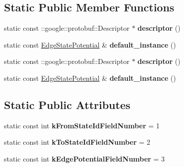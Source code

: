 \subsection*{Static Public Member Functions}
\begin{DoxyCompactItemize}
\item 
\hypertarget{classgraph_1_1EdgeStatePotential_a2256743e6b7a1cb3df066e83d437dd3b}{
static const ::google::protobuf::Descriptor $\ast$ {\bfseries descriptor} ()}
\label{classgraph_1_1EdgeStatePotential_a2256743e6b7a1cb3df066e83d437dd3b}

\item 
\hypertarget{classgraph_1_1EdgeStatePotential_a96e42fc32c65aa17a1482bd1a0d24ed3}{
static const \hyperlink{classgraph_1_1EdgeStatePotential}{EdgeStatePotential} \& {\bfseries default\_\-instance} ()}
\label{classgraph_1_1EdgeStatePotential_a96e42fc32c65aa17a1482bd1a0d24ed3}

\item 
\hypertarget{classgraph_1_1EdgeStatePotential_a2256743e6b7a1cb3df066e83d437dd3b}{
static const ::google::protobuf::Descriptor $\ast$ {\bfseries descriptor} ()}
\label{classgraph_1_1EdgeStatePotential_a2256743e6b7a1cb3df066e83d437dd3b}

\item 
\hypertarget{classgraph_1_1EdgeStatePotential_a96e42fc32c65aa17a1482bd1a0d24ed3}{
static const \hyperlink{classgraph_1_1EdgeStatePotential}{EdgeStatePotential} \& {\bfseries default\_\-instance} ()}
\label{classgraph_1_1EdgeStatePotential_a96e42fc32c65aa17a1482bd1a0d24ed3}

\end{DoxyCompactItemize}
\subsection*{Static Public Attributes}
\begin{DoxyCompactItemize}
\item 
\hypertarget{classgraph_1_1EdgeStatePotential_a74b8281941c70867a54fa40620a3e571}{
static const int {\bfseries kFromStateIdFieldNumber} = 1}
\label{classgraph_1_1EdgeStatePotential_a74b8281941c70867a54fa40620a3e571}

\item 
\hypertarget{classgraph_1_1EdgeStatePotential_a88d6891e1cf9539078473b830215f721}{
static const int {\bfseries kToStateIdFieldNumber} = 2}
\label{classgraph_1_1EdgeStatePotential_a88d6891e1cf9539078473b830215f721}

\item 
\hypertarget{classgraph_1_1EdgeStatePotential_a25bac96c29c696a2ba0e8a247f07dead}{
static const int {\bfseries kEdgePotentialFieldNumber} = 3}
\label{classgraph_1_1EdgeStatePotential_a25bac96c29c696a2ba0e8a247f07dead}

\end{DoxyCompactItemize}
